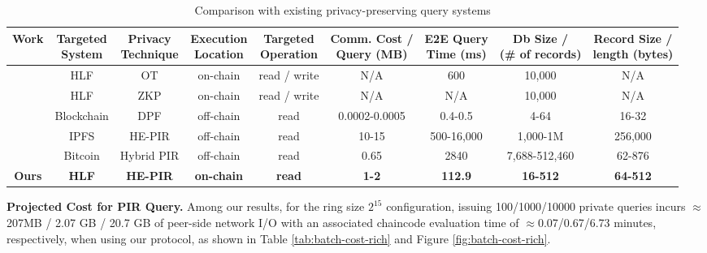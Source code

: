 \documentclass{ieeetj}
\begin{document}
\begin{table}[!htbp]
    \centering
    \caption{Comparison with existing privacy-preserving query systems}
    \label{tab:comparison-related}
        \begin{tabular}{|c|c|c|c|c|c|c|c|c|}
        \hline
        \textbf{Work} &  
        \shortstack{\textbf{Targeted} \\ \textbf{System}} &
        \shortstack{\textbf{Privacy} \\ \textbf{Technique}} &
        \shortstack{\textbf{Execution} \\ \textbf{Location}} &
        \shortstack{\textbf{Targeted} \\ \textbf{Operation}} &
        \shortstack{\textbf{Comm. Cost} / \\ \textbf{Query (MB)}} &
        \shortstack{\textbf{E2E Query} \\ \textbf{Time (ms)}} &
        \shortstack{\textbf{Db Size} / \\ \textbf{(\# of records)}} &
        \shortstack{\textbf{Record Size} / \\ \textbf{length (bytes)}} \\
        \hline
        \cite{kumar_debpir_2025} & HLF  & OT & on-chain & read / write & N/A & 600 & 10,000 & N/A \\
        \cite{kumar_bron_2024} & HLF & ZKP & on-chain & read / write & N/A & N/A & 10,000 & N/A \\
        \cite{xiao_cloak_2024} & Blockchain  & DPF & off-chain & read & 0.0002-0.0005 & 0.4-0.5 & 4-64 & 16-32 \\
        \cite{mazmudar_peer2pir_2025} & IPFS & HE-PIR & off-chain & read & 10-15 & 500-16,000 & 1,000-1M & 256,000 \\
        \cite{Kaihua2019applying} & Bitcoin & Hybrid PIR & off-chain & read & 0.65 & 2840 & 7,688-512,460 & 62-876 \\
        \textbf{Ours} & \textbf{HLF} & \textbf{HE-PIR} & \textbf{on-chain} & \textbf{read} & \textbf{1-2} & \textbf{112.9} & \textbf{16-512} & \textbf{64-512} \\
        \hline
        \end{tabular}
\end{table}

\noindent\textbf{Projected Cost for PIR Query.}
Among our results, for the ring size $2^{15}$ configuration, issuing 100/1000/10000 private queries incurs 
$\approx $207MB / 2.07 GB / 20.7 GB of peer-side network I/O with an associated chaincode evaluation time 
of $\approx$0.07/0.67/6.73 minutes, respectively, when using our protocol, as shown in Table \ref{tab:batch-cost-rich} 
and Figure \ref{fig:batch-cost-rich}.
\end{document}
